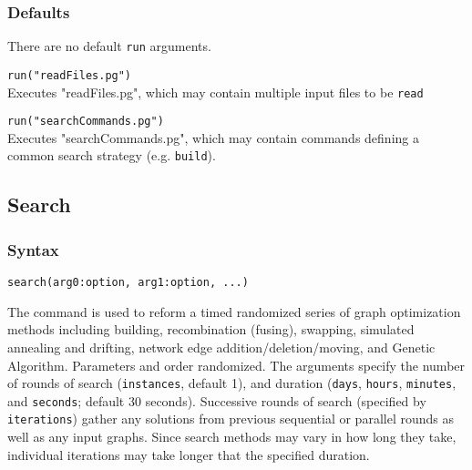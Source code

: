 	\subsubsection{Defaults}
		There are no default \texttt{run} arguments. 
	
	\begin{example}
		\item{\texttt{run("readFiles.pg")}\\ Executes "readFiles.pg", which may contain multiple input 
		files to be \texttt{read}}
		
		\item{\texttt{run("searchCommands.pg")}\\ Executes "searchCommands.pg", which may 
		contain commands defining a common search strategy (e.g. \texttt{build}).}
	\end{example}

\subsection{Search}
	\subsubsection{Syntax}
		\texttt{search(arg0:option, arg1:option, ...)}
	
	\begin{phygdescription}
		{The command is used to reform a timed randomized series of graph optimization methods 
		including building, recombination (fusing), swapping, simulated annealing and drifting, 
		network edge addition/deletion/moving, and Genetic Algorithm. Parameters and order
		randomized. The arguments specify the number of rounds of search (\texttt{instances}, 
		default 1), and duration (\texttt{days}, \texttt{hours}, \texttt{minutes}, and \texttt{seconds}; 
		default 30 seconds). Successive rounds of search (specified by \texttt{iterations}) gather 
		any solutions from previous sequential or parallel rounds as well as any input graphs.
		Since search methods may vary in how long they take, individual iterations may take 
		longer that the specified duration.}
	\end{phygdescription}
			
